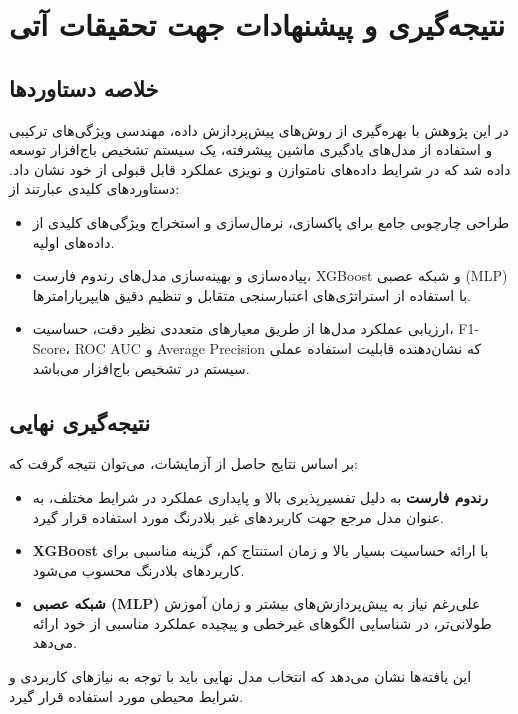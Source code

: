 \chapter{نتیجه‌گیری و پیشنهادات جهت تحقیقات آتی}

\section{خلاصه دستاوردها}
در این پژوهش با بهره‌گیری از روش‌های پیش‌پردازش داده، مهندسی ویژگی‌های ترکیبی و استفاده از مدل‌های یادگیری ماشین پیشرفته، یک سیستم تشخیص باج‌افزار توسعه داده شد که در شرایط داده‌های نامتوازن و نویزی عملکرد قابل قبولی از خود نشان داد. دستاوردهای کلیدی عبارتند از:
\begin{itemize}
    \item طراحی چارچوبی جامع برای پاکسازی، نرمال‌سازی و استخراج ویژگی‌های کلیدی از داده‌های اولیه.
    \item پیاده‌سازی و بهینه‌سازی مدل‌های رندوم فارست، XGBoost و شبکه عصبی (MLP) با استفاده از استراتژی‌های اعتبارسنجی متقابل و تنظیم دقیق هایپرپارامترها.
    \item ارزیابی عملکرد مدل‌ها از طریق معیارهای متعددی نظیر دقت، حساسیت، F1-Score، ROC AUC و Average Precision که نشان‌دهنده قابلیت استفاده عملی سیستم در تشخیص باج‌افزار می‌باشد.
\end{itemize}

\section{نتیجه‌گیری نهایی}
بر اساس نتایج حاصل از آزمایشات، می‌توان نتیجه گرفت که:
\begin{itemize}
    \item \textbf{رندوم فارست} به دلیل تفسیرپذیری بالا و پایداری عملکرد در شرایط مختلف، به عنوان مدل مرجع جهت کاربردهای غیر بلادرنگ مورد استفاده قرار گیرد.
    \item \textbf{XGBoost} با ارائه حساسیت بسیار بالا و زمان استنتاج کم، گزینه مناسبی برای کاربردهای بلادرنگ محسوب می‌شود.
    \item \textbf{شبکه عصبی (MLP)} علی‌رغم نیاز به پیش‌پردازش‌های بیشتر و زمان آموزش طولانی‌تر، در شناسایی الگوهای غیرخطی و پیچیده عملکرد مناسبی از خود ارائه می‌دهد.
\end{itemize}
این یافته‌ها نشان می‌دهد که انتخاب مدل نهایی باید با توجه به نیازهای کاربردی و شرایط محیطی مورد استفاده قرار گیرد.

